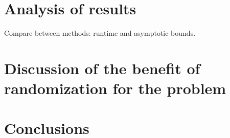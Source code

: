 \documentclass[nocopyrightspace]{acm_proc_article-sp}
\begin{document}


\section{Analysis of results}
Compare between methods: runtime and asymptotic bounds.

\section{Discussion of the benefit of randomization for the problem}

\section{Conclusions}



\balancecolumns
\end{document}
